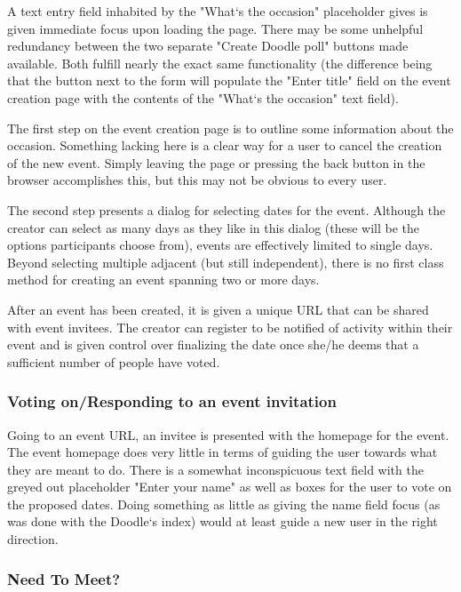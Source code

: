 \documentclass{sigchi}
\begin{document}
A text entry field inhabited by the "What`s the occasion"
placeholder gives is given immediate focus upon loading the
page. There may be some unhelpful redundancy between the two
separate "Create Doodle poll" buttons made available. Both fulfill
nearly the exact same functionality (the difference being that the
button next to the form will populate the "Enter title" field on the
event creation page with the contents of the "What`s the occasion"
text field).

The first step on the event creation page is to outline some
information about the occasion. Something lacking here is a clear
way for a user to cancel the creation of the new event. Simply
leaving the page or pressing the back button in the browser
accomplishes this, but this may not be obvious to every user.

The second step presents a dialog for selecting dates for the
event. Although the creator can select as many days as they like in
this dialog (these will be the options participants choose from),
events are effectively limited to single days. Beyond selecting
multiple adjacent (but still independent), there is no first class
method for creating an event spanning two or more days. 

After an event has been created, it is given a unique URL that can
be shared with event invitees. The creator can register to be
notified of activity within their event and is given control over
finalizing the date once she/he deems that a sufficient number of
people have voted.

\subsubsection{Voting on/Responding to an event invitation}

Going to an event URL, an invitee is presented with the homepage for
the event. The event homepage does very little in terms of guiding
the user towards what they are meant to do. There is a somewhat
inconspicuous text field with the greyed out placeholder "Enter your
name" as well as boxes for the user to vote on the proposed
dates. Doing something as little as giving the name field focus (as
was done with the Doodle`s index) would at least guide a new user in
the right direction.

\subsubsection{Need To Meet?}
\end{document}
